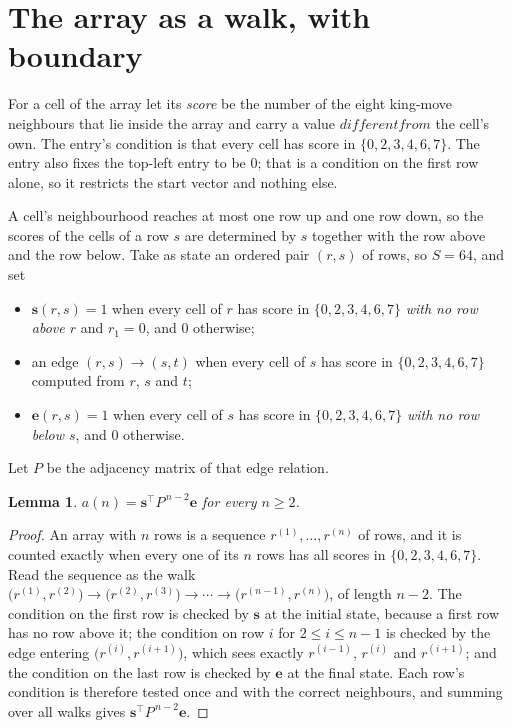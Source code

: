 \documentclass[11pt,a4paper]{article}
\theoremstyle{plain}
\newtheorem{lemma}[theorem]{Lemma}
\theoremstyle{definition}
\begin{document}
\section{The array as a walk, with boundary}

For a cell of the array let its \emph{score} be the number of the eight king-move neighbours that lie inside
the array and carry a value $different from$ the cell's own. The entry's condition is that every cell
has score in $\{0,2,3,4,6,7\}$. The entry also fixes the top-left entry to be $0$; that is a condition on the first row alone, so it restricts the start vector and nothing else.

A cell's neighbourhood reaches at most one row up and one row down, so the scores of the
cells of a row $s$ are determined by $s$ together with the row above and the row below.
Take as state an ordered pair $(r,s)$ of rows, so $S=64$, and set
\begin{itemize}
\item $\mathbf{s}(r,s)=1$ when every cell of $r$ has score in $\{0,2,3,4,6,7\}$ \emph{with no row
above $r$} and $r_1=0$, and $0$ otherwise;
\item an edge $(r,s)\to(s,t)$ when every cell of $s$ has score in $\{0,2,3,4,6,7\}$ computed from
$r$, $s$ and $t$;
\item $\mathbf{e}(r,s)=1$ when every cell of $s$ has score in $\{0,2,3,4,6,7\}$ \emph{with no row
below $s$}, and $0$ otherwise.
\end{itemize}
Let $P$ be the adjacency matrix of that edge relation.

\begin{lemma}\label{lem:walk}
$a(n)=\mathbf{s}^{\!\top}P^{\,n-2}\mathbf{e}$ for every $n\ge2$.
\end{lemma}

\begin{proof}
An array with $n$ rows is a sequence $r^{(1)},\dots,r^{(n)}$ of rows, and it is counted
exactly when every one of its $n$ rows has all scores in $\{0,2,3,4,6,7\}$. Read the sequence as the
walk $\bigl(r^{(1)},r^{(2)}\bigr)\to\bigl(r^{(2)},r^{(3)}\bigr)\to\cdots\to
\bigl(r^{(n-1)},r^{(n)}\bigr)$, of length $n-2$. The condition on the first row is
checked by $\mathbf{s}$ at the initial state, because a first row has no row above it; the
condition on row $i$ for $2\le i\le n-1$ is checked by the edge entering
$\bigl(r^{(i)},r^{(i+1)}\bigr)$, which sees exactly $r^{(i-1)}$, $r^{(i)}$ and
$r^{(i+1)}$; and the condition on the last row is checked by $\mathbf{e}$ at the final
state. Each row's condition is therefore tested once and with the correct neighbours, and
summing over all walks gives $\mathbf{s}^{\!\top}P^{\,n-2}\mathbf{e}$.
\end{proof}
\end{document}
